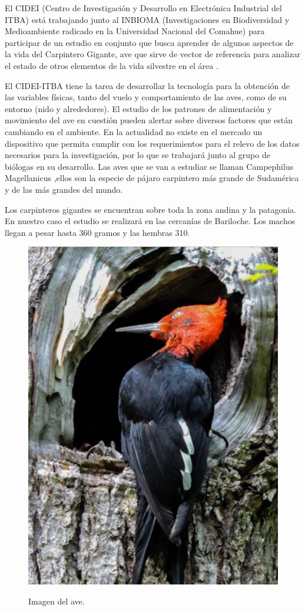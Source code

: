 El CIDEI (Centro de Investigación y Desarrollo en Electrónica Industrial del ITBA) está trabajando junto al INBIOMA (Investigaciones en Biodiversidad y Medioambiente radicado en la Universidad Nacional del Comahue) para participar de un estudio en conjunto que busca aprender de algunos aspectos de la vida del Carpintero Gigante, ave que sirve de vector de referencia para analizar el estado de otros elementos de la vida silvestre en el área \cite{ref:PaperValeriaOjeda}.

El CIDEI-ITBA tiene la tarea de desarrollar la tecnología para la obtención de las variables físicas, tanto del vuelo y comportamiento de las aves, como de su entorno (nido y alrededores). El estudio de los patrones de alimentación y movimiento del ave en cuestión pueden alertar sobre diversos factores que están cambiando en el ambiente. En la actualidad no existe en el mercado un dispositivo que permita cumplir con los requerimientos para el relevo de los datos necesarios para la investigación, por lo que se trabajará junto al grupo de biólogas en su desarrollo.
Las aves que se van a estudiar se llaman Campephilus Magellanicus ,ellos son la especie de pájaro carpintero más grande de Sudamérica y de las más grandes del mundo.

Los carpinteros gigantes se encuentran sobre toda la zona andina y la patagonia. En nuestro caso el estudio se realizará en las cercanías de Bariloche. Los machos llegan a pesar hasta 360 gramos y las hembras 310.

\begin{figure}[H]
	\centering
	\includegraphics[width=0.4\linewidth]{ImagenesIntroduccion/pajaro}
	\label{fig:pajaro}
	\caption{Imagen del ave.}
\end{figure}


